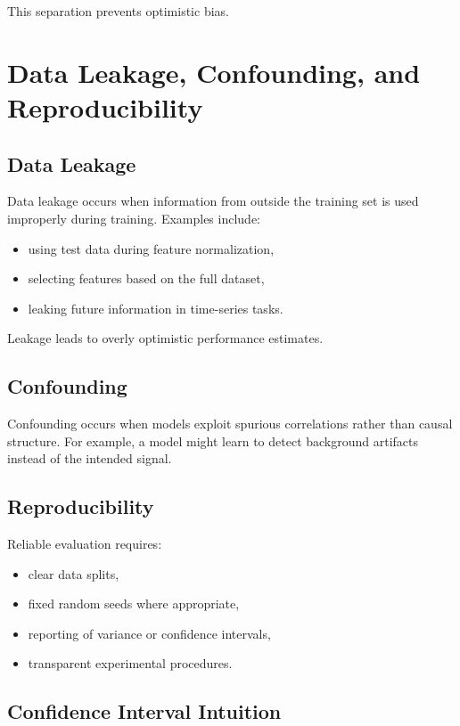 This separation prevents optimistic bias.

\section{Data Leakage, Confounding, and Reproducibility}

\subsection{Data Leakage}

Data leakage occurs when information from outside the training set is used improperly during training. Examples include:
\begin{itemize}
    \item using test data during feature normalization,
    \item selecting features based on the full dataset,
    \item leaking future information in time-series tasks.
\end{itemize}

Leakage leads to overly optimistic performance estimates.

\subsection{Confounding}

Confounding occurs when models exploit spurious correlations rather than causal structure. For example, a model might learn to detect background artifacts instead of the intended signal.

\subsection{Reproducibility}

Reliable evaluation requires:
\begin{itemize}
    \item clear data splits,
    \item fixed random seeds where appropriate,
    \item reporting of variance or confidence intervals,
    \item transparent experimental procedures.
\end{itemize}

\subsection{Confidence Interval Intuition}

